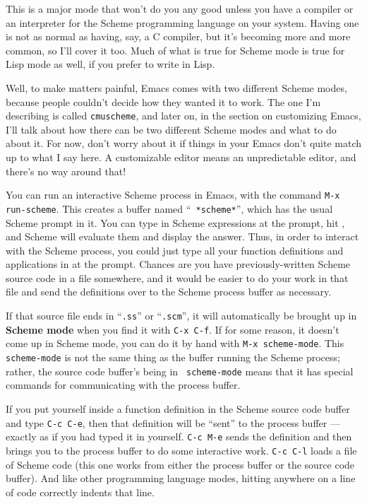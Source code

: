 This is a major mode that won't do you any good unless you have a
compiler or an interpreter for the Scheme programming language on your
system.  Having one is not as normal as having, say, a C compiler, but
it's becoming more and more common, so I'll cover it too.  Much of
what is true for Scheme mode is true for Lisp mode as
well, if you prefer to write in Lisp.

Well, to make matters painful, Emacs comes with two different Scheme
modes, because people couldn't decide how they wanted it to work.  The
one I'm describing is called {\tt cmuscheme}, and
later on, in the section on customizing Emacs, I'll talk about how
there can be two different Scheme modes and what to do about it.  For
now, don't worry about it if things in your Emacs don't quite match up
to what I say here.  A customizable editor means an unpredictable
editor, and there's no way around that!


        You can run an interactive Scheme process in Emacs, with the
command {\tt M-x run-scheme}.  This creates a buffer named ``{\tt
*scheme*}'', which has the usual Scheme prompt in it.  You can type in
Scheme expressions at the prompt, hit , and Scheme will
evaluate them and display the answer.  Thus, in order to interact with
the Scheme process, you could just type all your function definitions
and applications in at the prompt.  Chances are you have
previously-written Scheme source code in a file somewhere, and it
would be easier to do your work in that file and send the definitions
over to the Scheme process buffer as necessary.

        If that source file ends in ``{\tt .ss}'' or ``{\tt .scm}'',
it will automatically be brought up in {\bf Scheme mode} when you find
it with {\tt C-x~C-f}.  If for some reason, it doesn't come up in
Scheme mode, you can do it by hand with {\tt M-x scheme-mode}.  This
{\tt scheme-mode} is not the same thing as the buffer running the
Scheme process; rather, the source code buffer's being in {\tt
scheme-mode} means that it has special commands for communicating with
the process buffer.

        If you put yourself inside a function definition in the Scheme
source code buffer and type {\tt C-c~C-e}, then that definition will
be ``sent'' to the process buffer --- exactly as if you had typed it
in yourself.  {\tt C-c~M-e} sends the definition and then brings you
to the process buffer to do some interactive work.  {\tt C-c~C-l}
loads a file of Scheme code (this one works from either the process
buffer or the source code buffer).  And like other programming
language modes, hitting  anywhere on a line of code correctly
indents that line.

